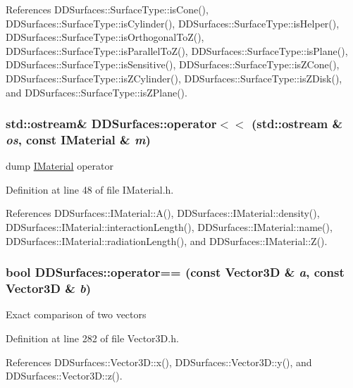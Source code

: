 References DDSurfaces::SurfaceType::isCone(), DDSurfaces::SurfaceType::isCylinder(), DDSurfaces::SurfaceType::isHelper(), DDSurfaces::SurfaceType::isOrthogonalToZ(), DDSurfaces::SurfaceType::isParallelToZ(), DDSurfaces::SurfaceType::isPlane(), DDSurfaces::SurfaceType::isSensitive(), DDSurfaces::SurfaceType::isZCone(), DDSurfaces::SurfaceType::isZCylinder(), DDSurfaces::SurfaceType::isZDisk(), and DDSurfaces::SurfaceType::isZPlane().\hypertarget{namespace_d_d_surfaces_a35c78a02d17fc318ec3712554a0da234}{
\subsubsection[{operator$<$$<$}]{\setlength{\rightskip}{0pt plus 5cm}std::ostream\& DDSurfaces::operator$<$$<$ (std::ostream \& {\em os}, \/  const IMaterial \& {\em m})}}
\label{namespace_d_d_surfaces_a35c78a02d17fc318ec3712554a0da234}


dump \hyperlink{class_d_d_surfaces_1_1_i_material}{IMaterial} operator 

Definition at line 48 of file IMaterial.h.

References DDSurfaces::IMaterial::A(), DDSurfaces::IMaterial::density(), DDSurfaces::IMaterial::interactionLength(), DDSurfaces::IMaterial::name(), DDSurfaces::IMaterial::radiationLength(), and DDSurfaces::IMaterial::Z().\hypertarget{namespace_d_d_surfaces_a2fac63bbe49a2ac54035b3b5100241b4}{
\subsubsection[{operator==}]{\setlength{\rightskip}{0pt plus 5cm}bool DDSurfaces::operator== (const Vector3D \& {\em a}, \/  const Vector3D \& {\em b})}}
\label{namespace_d_d_surfaces_a2fac63bbe49a2ac54035b3b5100241b4}
Exact comparison of two vectors 

Definition at line 282 of file Vector3D.h.

References DDSurfaces::Vector3D::x(), DDSurfaces::Vector3D::y(), and DDSurfaces::Vector3D::z().